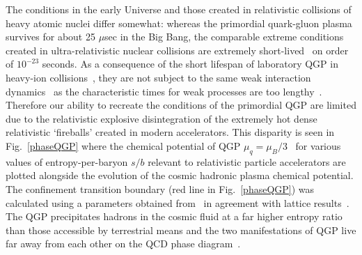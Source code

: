 \documentclass[universe,article,submit,moreauthors,pdftex,a4paper]{Definitions/mdpi}
\newcommand*{\rf}[1]{Fig.~{\ref{#1}}}
\begin{document}
The conditions in the early Universe and those created in relativistic collisions of heavy atomic nuclei differ somewhat: whereas the primordial quark-gluon plasma survives for about 25 $\mu$sec in the Big Bang, the comparable extreme conditions created in ultra-relativistic nuclear collisions are extremely short-lived~\cite{Rafelski:2001hp} on order of $10^{-23}$ seconds. As a consequence of the short lifespan of laboratory QGP in heavy-ion collisions~\cite{Ollitrault:1992bk,Petran:2013lja}, they are not subject to the same weak interaction dynamics~\cite{Ryu:2015vwa} as the characteristic times for weak processes are too lengthy~\cite{Rafelski:1982ii}. Therefore our ability to recreate the conditions of the primordial QGP are limited due to the relativistic explosive disintegration of the extremely hot dense relativistic `fireballs' created in modern accelerators. This disparity is seen in \rf{phaseQGP} where the chemical potential of QGP $\mu_{q}=\mu_{B}/3$~\cite{Rafelski:1987nv} for various values of entropy-per-baryon $s/b$ relevant to relativistic particle accelerators are plotted alongside the evolution of the cosmic hadronic plasma chemical potential. The confinement transition boundary (red line in \rf{phaseQGP}) was calculated using a parameters obtained from~\cite{Letessier:2002ony} in agreement with lattice results~\cite{HotQCD:2014kol}. The QGP precipitates hadrons in the cosmic fluid at a far higher entropy ratio than those accessible by terrestrial means and the two manifestations of QGP live far away from each other on the QCD phase diagram~\cite{Jacak:2012dx}.
\end{document}
